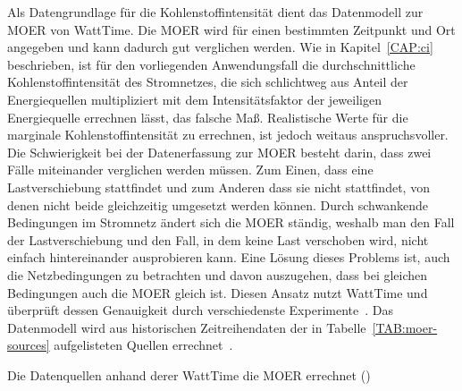 Als Datengrundlage für die Kohlenstoffintensität dient das Datenmodell zur \ac{MOER} von WattTime.
Die \ac{MOER} wird für einen bestimmten Zeitpunkt und Ort angegeben und kann dadurch gut verglichen werden.
Wie in Kapitel~\ref{CAP:ci} beschrieben, ist für den vorliegenden Anwendungsfall die durchschnittliche Kohlenstoffintensität des Stromnetzes, die sich schlichtweg aus Anteil der Energiequellen multipliziert mit dem Intensitätsfaktor der jeweiligen Energiequelle errechnen lässt, das falsche Maß.
Realistische Werte für die marginale Kohlenstoffintensität zu errechnen, ist jedoch weitaus anspruchsvoller.
Die Schwierigkeit bei der Datenerfassung zur \ac{MOER} besteht darin, dass zwei Fälle miteinander verglichen werden müssen.
Zum Einen, dass eine Lastverschiebung stattfindet und zum Anderen dass sie nicht stattfindet, von denen nicht beide gleichzeitig umgesetzt werden können.
Durch schwankende Bedingungen im Stromnetz ändert sich die \ac{MOER} ständig, weshalb man den Fall der Lastverschiebung und den Fall, in dem keine Last verschoben wird, nicht einfach hintereinander ausprobieren kann.
Eine Lösung dieses Problems ist, auch die Netzbedingungen zu betrachten und davon auszugehen, dass bei gleichen Bedingungen auch die \ac{MOER} gleich ist.
Diesen Ansatz nutzt WattTime und überprüft dessen Genauigkeit durch verschiedenste Experimente~\cite{WattTime.2022}.
Das Datenmodell wird aus historischen Zeitreihendaten der in Tabelle~\ref{TAB:moer-sources} aufgelisteten Quellen errechnet~\cite{WattTime.20231121T18:47:09+00:00}.
\begin{table}[t]
 \caption{Die Datenquellen anhand derer WattTime die MOER errechnet (\cite{WattTime.20231121T18:47:09+00:00})}
 \label{TAB:moer-sources}
 
\end{table}


